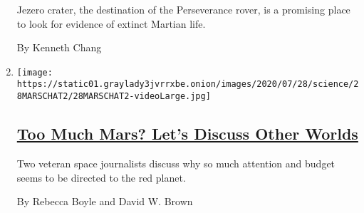 \begin{enumerate}
  Jezero crater, the destination of the Perseverance rover, is a
  promising place to look for evidence of extinct Martian life.

  By Kenneth Chang
\item
  \texttt{[image: https://static01.graylady3jvrrxbe.onion/images/2020/07/28/science/28MARSCHAT2/28MARSCHAT2-videoLarge.jpg]}

  \hypertarget{too-much-mars-lets-discuss-other-worlds}{%
  \subsection{\texorpdfstring{\href{/2020/07/28/science/mars-nasa-science.html}{Too
  Much Mars? Let's Discuss Other
  Worlds}}{Too Much Mars? Let's Discuss Other Worlds}}\label{too-much-mars-lets-discuss-other-worlds}}

  Two veteran space journalists discuss why so much attention and budget
  seems to be directed to the red planet.

  By Rebecca Boyle and David W. Brown
\end{enumerate}

